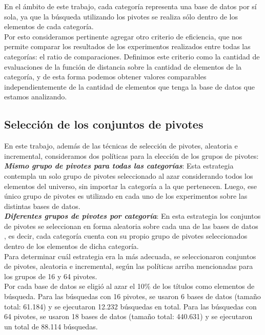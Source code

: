 En el \'ambito de este trabajo, cada categor\'ia representa una base de datos por s\'i sola, ya que la b\'usqueda utilizando los pivotes se realiza s\'olo dentro de los elementos de cada categor\'ia.\\

Por esto consideramos pertinente agregar otro criterio de eficiencia, que nos permite comparar los resultados de los experimentos realizados entre todas las categor\'ias: el ratio de comparaciones. Definimos este criterio como la cantidad de evaluaciones de la funci\'on de distancia sobre la cantidad de elementos de la categor\'ia, y de esta forma podemos obtener valores comparables independientemente de la cantidad de elementos que tenga la base de datos que estamos analizando.

\subsection{Selecci\'on de los conjuntos de pivotes}

En este trabajo, adem\'as de las t\'ecnicas de selecci\'on de pivotes, aleatoria e incremental, consideramos dos pol\'iticas para la elecci\'on de los grupos de pivotes:\\

\textit{\textbf{Mismo grupo de pivotes para todas las categor\'ias}}: Esta estrategia contempla un solo grupo de pivotes seleccionado al azar considerando todos los elementos del universo, sin importar la categor\'ia a la que pertenecen. Luego, ese \'unico grupo de pivotes es utilizado en cada uno de los experimentos sobre las distintas bases de datos.\\

\textit{\textbf{Diferentes grupos de pivotes por categor\'ia}}: En esta estrategia los conjuntos de pivotes se seleccionan en forma aleatoria sobre cada una de las bases de datos , es decir, cada categor\'ia cuenta con su propio grupo de pivotes seleccionados dentro de los elementos de dicha categor\'ia.\\

Para determinar cu\'al estrategia era la m\'as adecuada, se seleccionaron conjuntos de pivotes, aleatoria e incremental, seg\'un las pol\'iticas arriba mencionadas para los grupos de 16 y 64 pivotes.\\

Por cada base de datos se eligi\'o al azar el 10\% de los t\'itulos como elementos de b\'usqueda. Para las b\'usquedas con 16 pivotes, se usaron 6 bases de datos (tamaño total: 61.184) y se ejecutaron 12.232  b\'usquedas en total. Para las b\'usquedas con 64 pivotes, se usaron 18 bases de datos (tamaño total: 440.631) y se ejecutaron un total de 88.114 b\'usquedas.\\

